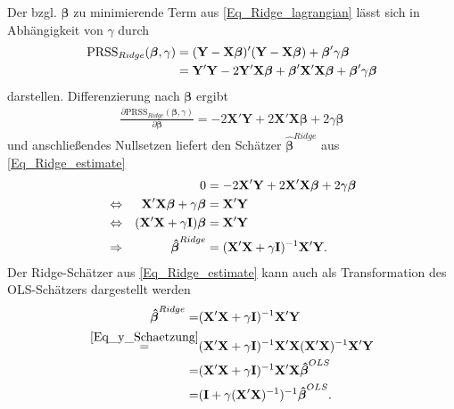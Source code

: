 \documentclass[12pt, a4paper]{report}\usepackage[]{graphicx}\usepackage[]{color}
\begin{document}
Der bzgl. $\boldsymbol{\beta}$ zu minimierende Term aus \eqref{Eq_Ridge_lagrangian} lässt sich in Abhängigkeit von $\gamma$ durch
\begin{align}\label{Eq_PRSS_Ridge}
\text{PRSS}_{Ridge}(\boldsymbol{\beta}, \gamma)&=(\mathbf{Y}-\mathbf{X}\boldsymbol{\beta})'(\mathbf{Y}-\mathbf{X}\boldsymbol{\beta})+\boldsymbol{\beta}'\gamma\boldsymbol{\beta} \notag \\
&=\mathbf{Y}'\mathbf{Y} -2\mathbf{Y}'\mathbf{X}\boldsymbol{\beta}+\boldsymbol{\beta}'\mathbf{X}'\mathbf{X}\boldsymbol{\beta}+\boldsymbol{\beta}'\gamma\boldsymbol{\beta}
\end{align}
darstellen. Differenzierung nach $\boldsymbol{\beta}$ ergibt
\begin{align}\label{Eq_Ableitung_Ridge}
\frac{\partial \text{PRSS}_{Ridge}(\boldsymbol{\beta}, \gamma)}{\partial  \boldsymbol{\beta}} = -2\mathbf{X}'\mathbf{Y} + 2\mathbf{X}'\mathbf{X}\boldsymbol{\beta} + 2\gamma \boldsymbol{\beta}
\end{align}
und anschließendes Nullsetzen liefert den Schätzer $\boldsymbol{\hat{\beta}}^{Ridge}$ aus \eqref{Eq_Ridge_estimate}
\begin{align*}
&& 0&=-2\mathbf{X}'\mathbf{Y} + 2\mathbf{X}'\mathbf{X}\boldsymbol{\beta} + 2\gamma \boldsymbol{\beta} \notag \\
&\Leftrightarrow & \mathbf{X}'\mathbf{X}\boldsymbol{\beta} + \gamma \boldsymbol{\beta} &= \mathbf{X}'\mathbf{Y} \notag \\
&\Leftrightarrow & (\mathbf{X}'\mathbf{X} + \gamma \mathbf{I}) \boldsymbol{\beta} &= \mathbf{X}'\mathbf{Y} \notag\\
&\Rightarrow & \boldsymbol{\hat{\beta}}^{Ridge} &= (\mathbf{X}'\mathbf{X} + \gamma \mathbf{I})^{-1}\mathbf{X}'\mathbf{Y}.
\end{align*}
Der Ridge-Schätzer aus \eqref{Eq_Ridge_estimate} kann auch als Transformation des OLS-Schätzers dargestellt werden \cite{hoerl_ridge_1970}
\begin{align}\label{Eq_ridge_transformation}
\boldsymbol{\hat{\beta}}^{Ridge} =&(\mathbf{X}'\mathbf{X} + \gamma \mathbf{I})^{-1}\mathbf{X}'\mathbf{Y} \notag\\
\stackrel{\eqref{Eq_y_Schaetzung}}{=}&(\mathbf{X}'\mathbf{X} + \gamma \mathbf{I})^{-1} \mathbf{X}'\mathbf{X} (\mathbf{X}'\mathbf{X})^{-1}\mathbf{X}'\mathbf{Y} \notag\\
=&(\mathbf{X}'\mathbf{X} + \gamma \mathbf{I})^{-1} \mathbf{X}'\mathbf{X} \boldsymbol{\hat{\beta}}^{OLS} \notag\\
=&(\mathbf{I} + \gamma (\mathbf{X}'\mathbf{X})^{-1})^{-1}  \boldsymbol{\hat{\beta}}^{OLS}.
\end{align}
\end{document}
